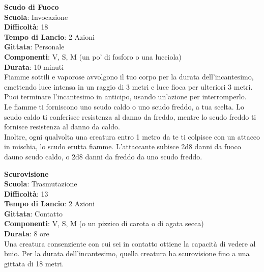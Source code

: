 \begin{multicols}{2}
\medskip\textbf{Scudo di Fuoco}\\
\textbf{Scuola}: Invocazione\\
\textbf{Difficoltà}:  18\\
\textbf{Tempo di Lancio}: 2 Azioni\\
\textbf{Gittata}: Personale\\
\textbf{Componenti}: V, S, M (un po’ di fosforo o una lucciola) \\
\textbf{Durata}: 10 minuti\\
Fiamme sottili e vaporose avvolgono il tuo corpo per la durata dell'incantesimo, emettendo luce intensa in un raggio di 3 metri e luce fioca per ulteriori 3 metri. Puoi terminare l'incantesimo in anticipo, usando un'azione per interromperlo.\\
Le fiamme ti forniscono uno scudo caldo o uno scudo freddo, a tua scelta. Lo scudo caldo ti conferisce resistenza al danno da freddo, mentre lo scudo freddo ti fornisce resistenza al danno da caldo.\\
Inoltre, ogni qualvolta una creatura entro 1 metro da te ti colpisce con un attacco in mischia, lo scudo erutta fiamme. L’attaccante subisce 2d8 danni da fuoco dauno scudo caldo, o 2d8 danni da  freddo da uno scudo freddo.

\medskip\textbf{Scurovisione}\\
\textbf{Scuola}: Trasmutazione\\
\textbf{Difficoltà}:  13\\
\textbf{Tempo di Lancio}: 2 Azioni\\
\textbf{Gittata}: Contatto\\
\textbf{Componenti}: V, S, M (o un pizzico di carota o di agata secca)\\
\textbf{Durata}: 8 ore\\
Una creatura consenziente con cui sei in contatto ottiene la capacità di vedere al buio. Per la durata dell'incantesimo, quella creatura ha scurovisione fino a una gittata di 18 metri.


\end{multicols}
